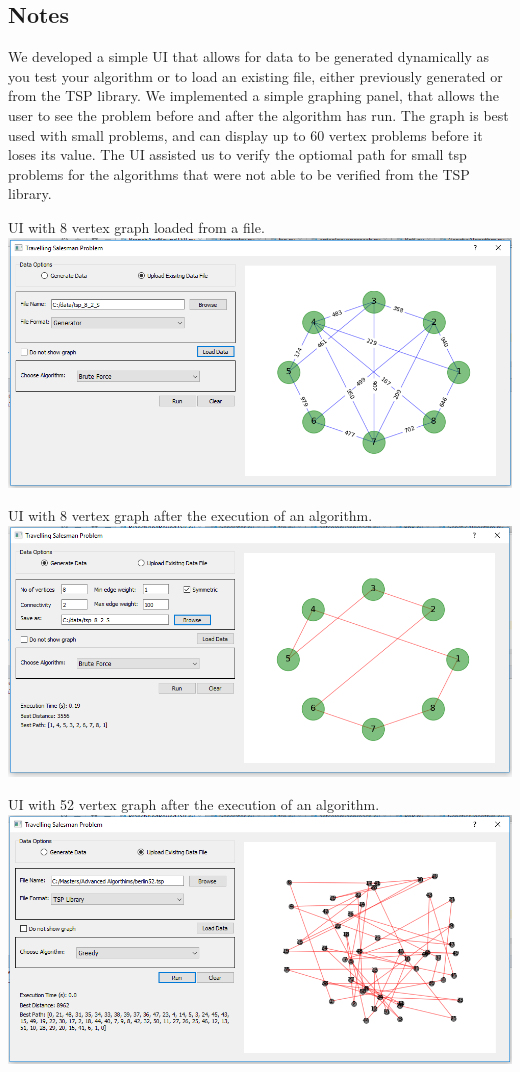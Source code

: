 \documentclass[11pt, english]{article}
\begin{document}
\subsection{Notes}
We developed a simple UI that allows for data to be generated dynamically as you test your algorithm or to load an existing file, either previously generated or from the TSP library. 
We implemented a simple graphing panel, that allows the user to see the problem before and after the algorithm has run. The graph is best used with small problems, and can display up to 60 vertex problems before it loses its value.
The UI assisted us to verify the optiomal path for small tsp problems for the algorithms that were not able to be verified from the TSP library.

\begin{center}
UI with 8 vertex graph loaded from a file.
\includegraphics[scale=0.60]{ui2.png}
\end{center}

\begin{center}
UI with 8 vertex graph after the execution of an algorithm.
\includegraphics[scale=0.60]{ui1.png}
\end{center}

\begin{center}
UI with 52 vertex graph after the execution of an algorithm.
\includegraphics[scale=0.60]{ui3.png}
\end{center}




\end{document}
